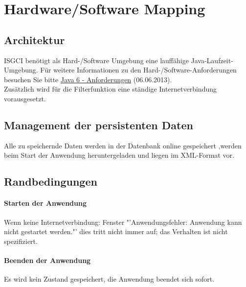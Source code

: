 \documentclass[10pt,a4paper]{article}
\begin{document}
\newpage
\section{Hardware/Software Mapping}
\subsection{Architektur}
ISGCI benötigt als Hard-/Software Umgebung eine lauffähige Java-Laufzeit-Umgebung. Für weitere Informationen zu den Hard-/Software-Anforderungen besuchen Sie bitte 
\href{http://www.oracle.com/technetwork/java/javase/system-configurations-135212.html}{Java 6 - Anforderungen} (06.06.2013).
\\Zusätzlich wird für die Filterfunktion eine ständige Internetverbindung vorausgesetzt.

\subsection{Management der persistenten Daten}
Alle zu speichernde Daten werden in der Datenbank online gespeichert ,werden beim Start der Anwendung heruntergeladen und liegen im XML-Format vor.
\subsection{Randbedingungen}
\paragraph{Starten der Anwendung}
Wenn keine Internetverbindung: Fenster "'Anwendungsfehler: Anwendung kann nicht gestartet werden."' dies tritt nicht immer auf; das Verhalten ist nicht spezifiziert.
\paragraph{Beenden der Anwendung}
Es wird kein Zustand gespeichert, die Anwendung beendet sich sofort.
\end{document}
